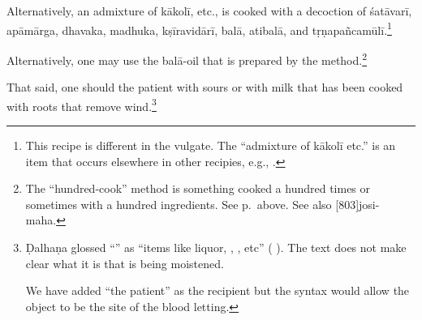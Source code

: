 \begin{translation}
    Alternatively, an admixture of \gls{kākolī}, etc., is
    cooked with a decoction of
    \gls{śatāvarī}, \gls{apāmārga},
    \gls{dhavaka}, \gls{madhuka}, \gls{kṣīravidārī},
    \gls{balā},
    \gls{atibalā}, and \gls{tṛṇapañcamūlī}.\footnote{This
        recipe is different in
        the vulgate.  The “admixture of \gls{kākolī} etc.” is
        an item that occurs
        elsewhere in other recipies, e.g.,
        .}


    Alternatively, one may use the \gls{balā}-oil that is
    prepared by the
    method.\footnote{The “hundred-cook” method
        is something cooked a hundred times or
        sometimes with a hundred
        ingredients. See p.\,\pageref{satapaka} above.
        See also
        [803]{josi-maha}.}

    That said, one should 
    the patient with sours or with milk that
    has been cooked with roots that remove
    wind.\footnote{Ḍalhaṇa glossed
        “” as “items like liquor,
        ,
        , etc”
        (
        ).  The text does not
        make clear what it is that
        is being moistened.

        We have added “the patient” as the recipient
        but
        the syntax would allow the object to be the site
        of the blood letting.}






\end{translation}
